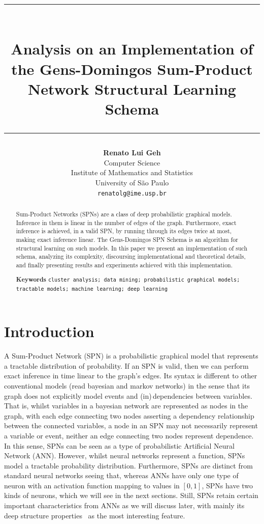 \documentclass{amsart}
\title{%
  \noindent\rule{13cm}{1.0pt}\\
  \vspace{0.2cm}
  Analysis on an Implementation of the Gens-Domingos Sum-Product Network Structural Learning
  Schema
  \noindent\rule{13cm}{0.8pt}
}
\author[]{\normalsize\textbf{Renato Lui Geh}\\\small Computer Science\\Institute of Mathematics
  and Statistics\\University of São Paulo\\\texttt{renatolg@ime.usp.br}}
\theoremstyle{plain}
\numberwithin{equation}{section}
\begin{document}
\begin{abstract}
  Sum-Product Networks (SPNs) are a class of deep probabilistic graphical models. Inference in them
  is linear in the number of edges of the graph. Furthermore, exact inference is achieved, in a
  valid SPN, by running through its edges twice at most, making exact inference linear. The
  Gens-Domingos SPN Schema is an algorithm for structural learning on such models. In this paper we
  present an implementation of such schema, analyzing its complexity, discoursing implementational
  and theoretical details, and finally presenting results and experiments achieved with this
  implementation.

  \smallskip
  \smallskip
  \smallskip
  \textbf{Keywords}
  \smallskip
  \texttt{cluster analysis; data mining; probabilistic graphical models; tractable models; machine
  learning; deep learning}
  \vspace*{-3.5em}
\end{abstract}

\maketitle

\section{Introduction}

A Sum-Product Network (SPN) is a probabilistic graphical model that represents a tractable
distribution of probability. If an SPN is valid, then we can perform exact inference in time linear
to the graph's edges. Its syntax is different to other conventional models (read bayesian and
markov networks) in the sense that its graph does not explicitly model events and
(in)\,dependencies between variables. That is, whilst variables in a bayesian network are
represented as nodes in the graph, with each edge connecting two nodes asserting a dependency
relationship between the connected variables, a node in an SPN may not necessarily represent a
variable or event, neither an edge connecting two nodes represent dependence. In this sense, SPNs
can be seen as a type of probabilistic Artificial Neural Network (ANN). However, whilst neural
networks represent a function, SPNs model a tractable probability distribution. Furthermore, SPNs
are distinct from standard neural networks seeing that, whereas ANNs have only one type of neuron
with an activation function mapping to values in $[0,1]$, SPNs have two kinds of neurons, which we
will see in the next sections. Still, SPNs retain certain important characteristics from ANNs as we
will discuss later, with mainly its deep structure properties~\cite{shallow-vs-deep} as the most
interesting feature.
\end{document}
